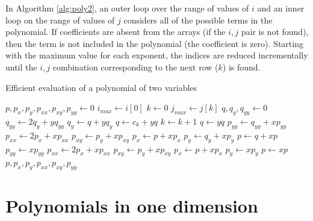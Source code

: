 In Algorithm \ref{alg:poly2}, an outer loop over the range of values of $i$ and an inner loop on the range of values of $j$ considers all of the possible terms in the polynomial.  If coefficients are absent from the arrays (if the $i,j$ pair is not found), then the term is not included in the polynomial (the coefficient is zero).  Starting with the maximum value for each exponent, the indices are reduced incrementally until the $i,j$ combination corresponding to the next row ($k$) is found.

\begin{algorithm}
\caption{Efficient evaluation of a polynomial of two variables}\label{alg:poly2}
\begin{algorithmic}[1]
 
\State $p, p_x, p_y, p_{xx}, p_{xy}, p_{yy} \gets 0$  
\State $i_{max} \gets i[0]$  
\State $k \gets 0$ 
   
     
        \State $j_{max} \gets j[k]$ 
        \State $q,q_y,q_{yy} \gets 0$   
         
            \State $q_{yy} \gets 2 q_y + y q_{yy}$
            \State $q_y \gets q + y q_y$
              
                \State $q \gets c_k + y q$
                \State $k \gets k+1$
            \Else   {}
                \State $q \gets y q$
            \EndIf
        \EndFor
        \State $p_{yy} \gets q_{yy} + x p_{yy}$
        \State $p_{xx} \gets 2 p_x + x p_{xx}$
        \State $p_{xy} \gets p_y + x p_{xy}$
        \State $p_x \gets p + x p_x$
        \State $p_y \gets q_y + x p_y$
        \State $p \gets q + x p$
    \Else {}
        \State $p_{yy} \gets x p_{yy}$
        \State $p_{xx} \gets 2 p_x + x p_{xx}$
        \State $p_{xy} \gets p_y + x p_{xy}$
        \State $p_x \gets p + x p_x$
        \State $p_y \gets x p_y$
        \State $p \gets x p$
    \EndIf
\EndFor
\State \Return $p,p_x,p_y,p_{xx},p_{xy},p_{yy}$
\EndProcedure
\end{algorithmic}
\end{algorithm}

\section{Polynomials in one dimension}\label{sec:num:poly1}

